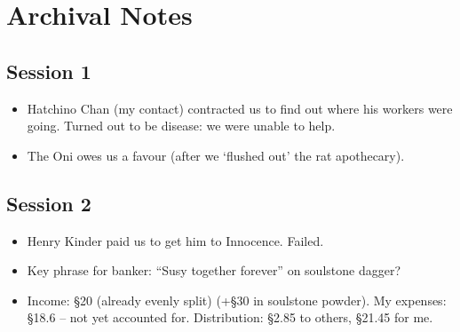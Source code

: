 \documentclass[10pt,a4paper]{article}
\begin{document}
\begin{minipage}[t]{\textwidth}

\section*{Archival Notes}

\subsection*{Session 1}

	\begin{itemize}
	  \item Hatchino Chan (my contact) contracted us to find out where his workers were going. Turned out to be disease: we were unable to help.
	  \item The Oni owes us a favour (after we `flushed out' the rat apothecary).
	\end{itemize}
	
\subsection*{Session 2} 

  \begin{itemize}
    \item Henry Kinder paid us to get him to Innocence. Failed.
    \item Key phrase for banker: ``Susy together forever'' on soulstone dagger?
    \item Income: §20 (already evenly split) (+§30 in soulstone powder). My expenses: §18.6 -- not yet accounted for. Distribution: §2.85 to others, §21.45 for me.
  \end{itemize}

\end{minipage}

\newpage
\end{document}
